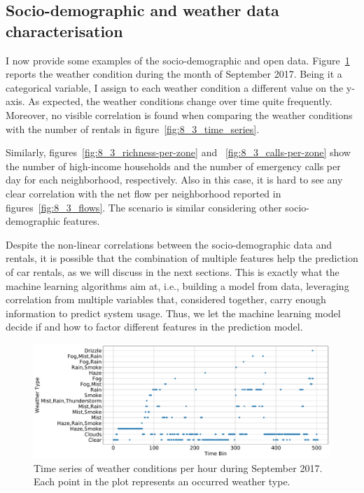 \subsection{Socio-demographic and weather data characterisation}

I now provide some examples of the socio-demographic and open data. Figure~\ref{fig:8_3_weather-per-day} reports the weather condition during the month of September 2017. Being it a categorical variable, I assign to each weather condition a different value on the y-axis. As expected, the weather conditions change over time quite frequently. Moreover, no visible correlation is found when comparing the weather conditions with the number of rentals in figure~\ref{fig:8_3_time_series}. 

Similarly, figures~\ref{fig:8_3_richness-per-zone} and ~\ref{fig:8_3_calls-per-zone} show the number of high-income households and the number of emergency calls per day for each neighborhood, respectively. Also in this case, it is hard to see any clear correlation with the net flow per neighborhood reported in figures~\ref{fig:8_3_flows}. The scenario is similar considering other socio-demographic features.

Despite the non-linear correlations between the socio-demographic data and rentals, it is possible that the combination of multiple features help the prediction of car rentals, as we will discuss in the next sections. 
This is exactly what the machine learning algorithms aim at, i.e., building a model from data, leveraging correlation from multiple variables that, considered together, carry enough information to predict system usage.
Thus, we let the machine learning model decide if and how to factor different features in the prediction model.

\begin{figure}
    \centering
    \includegraphics[width=0.8\columnwidth]{figures/temporal_characterization/WeatherPeriod2.pdf}
     \caption{Time series of weather conditions per hour during September 2017. Each point in the plot represents an occurred weather type.}
     \label{fig:8_3_weather-per-day}
\end{figure}


